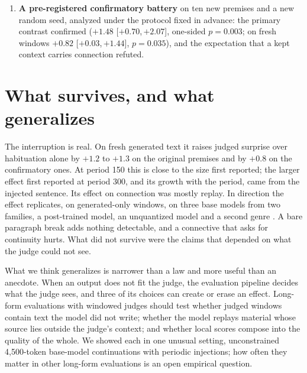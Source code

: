 \documentclass[11pt]{article}
\newcommand{\ci}[2]{[$#1$,\,$#2$]}
\begin{document}
\begin{enumerate}[leftmargin=1.5em,itemsep=0.15em]
on a freelance platform, blind to hypotheses and conditions, rated 63
first-protocol windows (nine per condition, stratified by the judge's
surprise score) on surprise and coherence. Their consensus agrees with the
judge at $\rho=0.58$ on surprise ($p=7\times10^{-7}$; single raters 0.40 to
0.50; inter-rater Krippendorff $\alpha=0.30$) and reproduces the ordering of
conditions; on coherence they rank the interrupted arms below the habituated
one, which the judge does not. These data support the ordering of
conditions on surprise and a moderate agreement with the judge. They do not
validate the corrected effect sizes, connection, or the document level,
which rest on LLM judges; a second round on fresh generated-only windows was
designed but not run.
\item \textbf{A pre-registered confirmatory battery} on ten new premises and
a new random seed, analyzed under the protocol fixed in advance: the primary
contrast confirmed ($+1.48$ \ci{+0.70}{+2.07}, one-sided $p=0.003$; on fresh
windows $+0.82$ \ci{+0.03}{+1.44}, $p=0.035$), and the expectation that a
kept context carries connection refuted.
\end{enumerate}

\section{What survives, and what generalizes}

The interruption is real. On fresh generated text it raises judged surprise
over habituation alone by $+1.2$ to $+1.3$ on the original premises and by
$+0.8$ on the confirmatory ones. At period 150 this is close to the size
first reported; the larger effect first reported at period 300, and its growth
with the period, came from the injected sentence. Its effect on connection
was mostly replay. In direction the effect replicates, on generated-only
windows, on three base models from two families, a post-trained model, an
unquantized model and a second genre \citep{ono2026interrupting}. A bare
paragraph break adds nothing detectable, and a connective that asks for
continuity hurts. What did not survive were the claims that depended on what
the judge could not see.

What we think generalizes is narrower than a law and more useful than an
anecdote. When an output does not fit the judge, the evaluation pipeline
decides what the judge sees, and three of its choices can create or erase an
effect. Long-form evaluations with windowed judges should test whether
judged windows contain text the model did not write; whether the model
replays material whose source lies outside the judge's context; and whether
local scores compose into the quality of the whole. We showed each in one
unusual setting, unconstrained 4,500-token base-model continuations with
periodic injections; how often they matter in other long-form evaluations
is an open empirical question.
\end{document}
